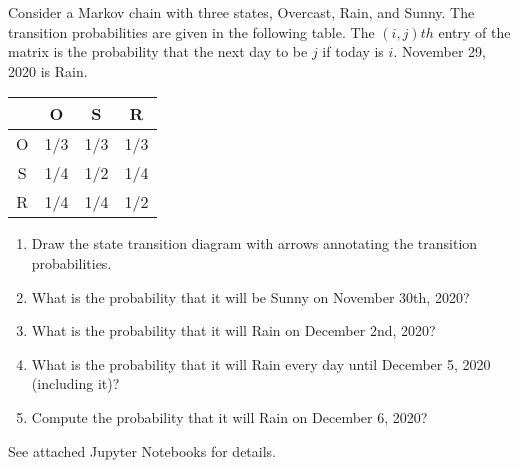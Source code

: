 \documentclass[11pt]{article}
\newenvironment{problem}[2][Problem]{\begin{trivlist}
\item[\hskip \labelsep {\bfseries #1}\hskip \labelsep {\bfseries #2.}]}{\end{trivlist}}
\begin{document}
\begin{problem}{2 (30 points)}
Consider a Markov chain with three states, Overcast, Rain, and Sunny. The transition probabilities are given in the following table. The $(i,j)th$ entry of the matrix is the probability that the next day to be $j$ if today is $i$. November 29, 2020 is Rain.
\begin{center}
  \begin{tabular}{ |c |c | c | c |}
    \hline
       & O  & S & R \\ \hline
     O & 1/3 & 1/3 & 1/3  \\ \hline            
     S & 1/4 &  1/2 & 1/4  \\ \hline 
     R & 1/4 & 1/4 & 1/2 \\ \hline 
  \end{tabular}
\end{center}
\begin{enumerate}
\item
Draw the state transition diagram with arrows annotating the transition probabilities. 
\item
What is the probability that it will be Sunny on November 30th, 2020? 
\item 
What is the probability that it will Rain on December 2nd, 2020?
\item
What is the probability that it will Rain every day until December 5, 2020 (including it)? 
\item
Compute the probability that it will Rain on December 6, 2020?
\end{enumerate}

\end{problem}

\begin{problem}{3 (30 points)}
	See attached Jupyter Notebooks for details.
\end{problem}
\end{document}
